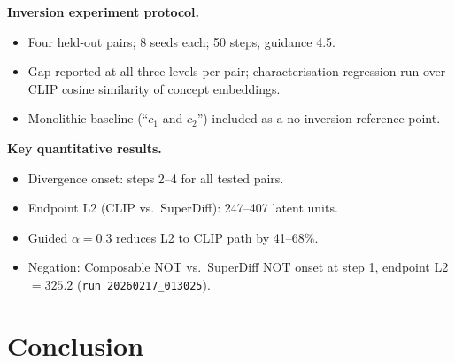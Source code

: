 \documentclass[runningheads]{llncs}
\begin{document}
\textbf{Inversion experiment protocol.}
\begin{itemize}
  \item Four held-out pairs; 8 seeds each; 50 steps, guidance 4.5.
  \item Gap reported at all three levels per pair; characterisation
    regression run over CLIP cosine similarity of concept embeddings.
  \item Monolithic baseline (``$c_1$ and $c_2$'') included as a
    no-inversion reference point.
\end{itemize}

\textbf{Key quantitative results.}
\begin{itemize}
  \item Divergence onset: steps 2--4 for all tested pairs.
  \item Endpoint L2 (CLIP vs.\ SuperDiff): 247--407 latent units.
  \item Guided $\alpha = 0.3$ reduces L2 to CLIP path by 41--68\%.
  \item Negation: Composable NOT vs.\ SuperDiff NOT onset at step 1,
    endpoint L2 $= 325.2$ (\texttt{run 20260217\_013025}).
\end{itemize}

\section{Conclusion}




\end{document}
